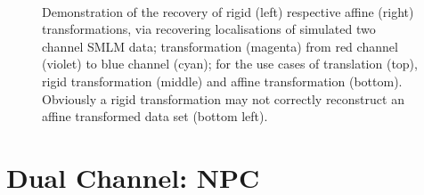 \documentclass[11pt, a4paper, oneside, twocolumn]{report}
\begin{document}
\begin{figure}[!t]
\begin{subfigure}[t!]{0.44\textwidth}
  \end{subfigure}
  ~
  \begin{subfigure}[t!]{0.44\textwidth}
    \centering
  \end{subfigure}
  \caption{Demonstration of the recovery of rigid (left) respective
    affine (right) transformations, via recovering localisations of
    simulated two channel SMLM data; transformation (magenta) from red
    channel (violet) to blue channel (cyan); for the use cases of
    translation (top), rigid transformation (middle) and affine
    transformation (bottom). Obviously a rigid transformation may not
    correctly reconstruct an affine transformed data set (bottom
    left).}
  \label{f:transim}
\end{figure}


\clearpage\section{Dual Channel: NPC}
\end{document}
